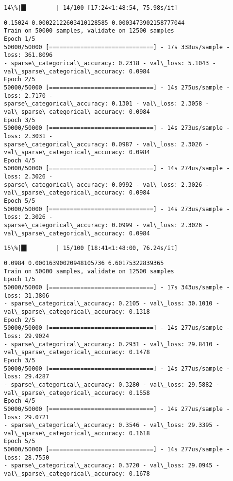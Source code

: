 \documentclass[11pt]{article}
\begin{document}
    \begin{Verbatim}[commandchars=\\\{\}]
 14\%|█▍        | 14/100 [17:24<1:48:54, 75.98s/it]
    \end{Verbatim}

    \begin{Verbatim}[commandchars=\\\{\}]
0.15024 0.00022122603410128585 0.0003473902158777044
Train on 50000 samples, validate on 12500 samples
Epoch 1/5
50000/50000 [==============================] - 17s 338us/sample - loss: 361.8096
- sparse\_categorical\_accuracy: 0.2318 - val\_loss: 5.1043 -
val\_sparse\_categorical\_accuracy: 0.0984
Epoch 2/5
50000/50000 [==============================] - 14s 275us/sample - loss: 2.7170 -
sparse\_categorical\_accuracy: 0.1301 - val\_loss: 2.3058 -
val\_sparse\_categorical\_accuracy: 0.0984
Epoch 3/5
50000/50000 [==============================] - 14s 273us/sample - loss: 2.3031 -
sparse\_categorical\_accuracy: 0.0987 - val\_loss: 2.3026 -
val\_sparse\_categorical\_accuracy: 0.0984
Epoch 4/5
50000/50000 [==============================] - 14s 274us/sample - loss: 2.3026 -
sparse\_categorical\_accuracy: 0.0992 - val\_loss: 2.3026 -
val\_sparse\_categorical\_accuracy: 0.0984
Epoch 5/5
50000/50000 [==============================] - 14s 273us/sample - loss: 2.3026 -
sparse\_categorical\_accuracy: 0.0999 - val\_loss: 2.3026 -
val\_sparse\_categorical\_accuracy: 0.0984
    \end{Verbatim}

    \begin{Verbatim}[commandchars=\\\{\}]
 15\%|█▌        | 15/100 [18:41<1:48:00, 76.24s/it]
    \end{Verbatim}

    \begin{Verbatim}[commandchars=\\\{\}]
0.0984 0.00016390020948105736 6.60175322839365
Train on 50000 samples, validate on 12500 samples
Epoch 1/5
50000/50000 [==============================] - 17s 343us/sample - loss: 31.3806
- sparse\_categorical\_accuracy: 0.2105 - val\_loss: 30.1010 -
val\_sparse\_categorical\_accuracy: 0.1318
Epoch 2/5
50000/50000 [==============================] - 14s 277us/sample - loss: 29.9024
- sparse\_categorical\_accuracy: 0.2931 - val\_loss: 29.8410 -
val\_sparse\_categorical\_accuracy: 0.1478
Epoch 3/5
50000/50000 [==============================] - 14s 277us/sample - loss: 29.4287
- sparse\_categorical\_accuracy: 0.3280 - val\_loss: 29.5882 -
val\_sparse\_categorical\_accuracy: 0.1558
Epoch 4/5
50000/50000 [==============================] - 14s 277us/sample - loss: 29.0721
- sparse\_categorical\_accuracy: 0.3546 - val\_loss: 29.3395 -
val\_sparse\_categorical\_accuracy: 0.1618
Epoch 5/5
50000/50000 [==============================] - 14s 277us/sample - loss: 28.7550
- sparse\_categorical\_accuracy: 0.3720 - val\_loss: 29.0945 -
val\_sparse\_categorical\_accuracy: 0.1678
    \end{Verbatim}
\end{document}
